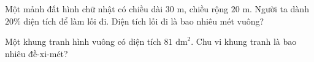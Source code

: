 \begin{ex}
  Một mảnh đất hình chữ nhật có chiều dài $30\text{ m}$, chiều rộng $20\text{ m}$. Người ta dành $20\%$ diện tích để làm lối đi. Diện tích lối đi là bao nhiêu mét vuông?
\end{ex}

\begin{ex}
  Một khung tranh hình vuông có diện tích $81\text{ dm}^2$. Chu vi khung tranh là bao nhiêu đề-xi-mét?
\end{ex}

